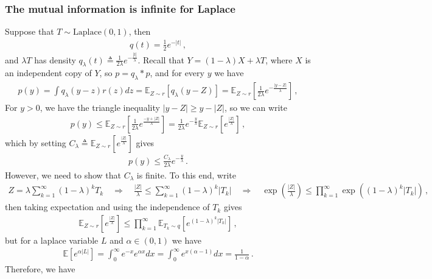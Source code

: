 \documentclass{article}
\theoremstyle{plain}
\theoremstyle{definition}
\theoremstyle{plain}
\newcommand{\E}{\mathbb E}
\begin{document}
\subsubsection{The mutual information is infinite for Laplace}
Suppose that $T \sim \mathrm{Laplace}(0, 1)$, then
\begin{align}
    q(t) = \frac{1}{2} e^{-|t|}\,,
\end{align}
and $\lambda T$ has density $q_\lambda(t) \triangleq \frac{1}{2\lambda} e^{-\frac{|t|}{\lambda}}$.
Recall that $Y = (1-\lambda) X + \lambda T$, where $X$ is an independent copy of $Y$, so $p = q_\lambda * p$, and
for every $y$ we have
\begin{align}
    p(y) = \int q_\lambda(y - z) r(z) dz = \E_{Z \sim r} \left[q_\lambda(y - Z)\right]
    = \E_{Z \sim r} \left[\frac{1}{2\lambda} e^{-\frac{|y-Z|}{\lambda}}\right]\,,
\end{align}
For $y > 0$, we have the triangle inequality $|y-Z| \ge y - |Z|$, so we can write
\begin{align}
    p(y) \le \E_{Z \sim r} \left[\frac{1}{2\lambda} e^{\frac{-y + |Z|}{\lambda}}\right] = \frac{1}{2\lambda} e^{-\frac{y}{\lambda}} \E_{Z \sim r} \left[e^{\frac{|Z|}{\lambda}}\right]\,,
\end{align}
which by setting $C_\lambda \triangleq \E_{Z \sim r} \left[e^{\frac{|Z|}{\lambda}}\right]$ gives
\begin{align}
    p(y) \le \frac{C_\lambda}{2\lambda} e^{-\frac{y}{\lambda}}\,.
\end{align}
However, we need to show that $C_\lambda$ is finite. To this end, write
\begin{align}
    Z = \lambda \sum_{k=1}^\infty (1-\lambda)^k T_k \quad \Rightarrow \quad \frac{|Z|}{\lambda} \leq \sum_{k=1}^\infty (1-\lambda)^k |T_k|
    \quad \Rightarrow \quad \exp(\frac{|Z|}{\lambda}) \leq \prod_{k=1}^\infty \exp((1-\lambda)^k |T_k|)\,,
\end{align}
then taking expectation and using the independence of $T_k$ gives
\begin{align}
    \E_{Z \sim r} \left[e^{\frac{|Z|}{\lambda}}\right] \leq \prod_{k=1}^\infty \E_{T_k \sim q} \left[e^{(1-\lambda)^k |T_k|}\right]\,,
\end{align}
but for a laplace variable $L$ and $\alpha \in (0,1)$ we have
\begin{align}
    \E[e^{\alpha |L|}] = \int_0^\infty e^{-x} e^{\alpha x} dx = \int_0^\infty e^{x(\alpha - 1)}dx = \frac{1}{1 - \alpha}\,.
\end{align}
Therefore, we have
\end{document}
